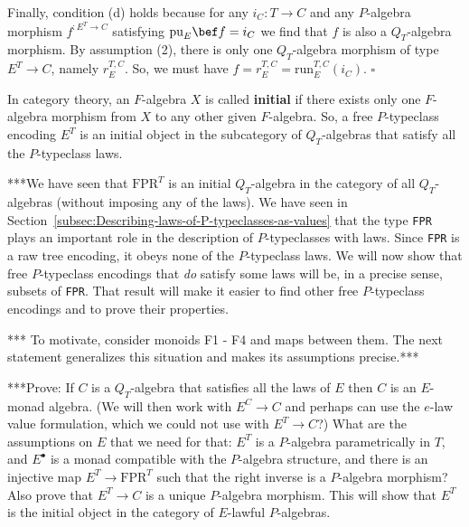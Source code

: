 Finally, condition (d) holds because for any $i_{C}:T\rightarrow C$
and any $P$-algebra morphism $f^{:E^{T}\rightarrow C}$ satisfying
$\text{pu}_{E}\bef f=i_{C}$ we find that $f$ is also a $Q_{T}$-algebra
morphism. By assumption (2), there is only one $Q_{T}$-algebra morphism
of type $E^{T}\rightarrow C$, namely $r_{E}^{T,C}$. So, we must
have $f=r_{E}^{T,C}=\text{run}_{E}^{T,C}(i_{C})$. $\square$

In category theory, an $F$-algebra $X$ is called \textbf{initial}
if there exists only one $F$-algebra morphism from $X$ to any other
given $F$-algebra. So, a free $P$-typeclass encoding $E^{T}$ is
an initial object in the subcategory of $Q_{T}$-algebras that satisfy
all the $P$-typeclass laws.

{*}{*}{*}We have seen that $\text{FPR}^{T}$ is an initial $Q_{T}$-algebra
in the category of all $Q_{T}$-algebras (without imposing any of
the laws). We have seen in Section~\ref{subsec:Describing-laws-of-P-typeclasses-as-values}
that the type \lstinline!FPR!
plays an important role in the description of $P$-typeclasses with
laws. Since \lstinline!FPR!
is a raw tree encoding, it obeys none of the $P$-typeclass laws.
We will now show that free $P$-typeclass encodings that \emph{do}
satisfy some laws will be, in a precise sense, subsets of \lstinline!FPR!.
That result will make it easier to find other free $P$-typeclass
encodings and to prove their properties.

{*}{*}{*} To motivate, consider monoids F1 - F4 and maps between them.
The next statement generalizes this situation and makes its assumptions
precise.{*}{*}{*}

{*}{*}{*}Prove: If $C$ is a $Q_{T}$-algebra that satisfies all the
laws of $E$ then $C$ is an $E$-monad algebra. (We will then work
with $E^{C}\rightarrow C$ and perhaps can use the $e$-law value
formulation, which we could not use with $E^{T}\rightarrow C$?) What
are the assumptions on $E$ that we need for that: $E^{T}$ is a $P$-algebra
parametrically in $T$, and $E^{\bullet}$ is a monad compatible with
the $P$-algebra structure, and there is an injective map $E^{T}\rightarrow\text{FPR}^{T}$
such that the right inverse is a $P$-algebra morphism? Also prove
that $E^{T}\rightarrow C$ is a unique $P$-algebra morphism. This
will show that $E^{T}$ is the initial object in the category of $E$-lawful
$P$-algebras.


